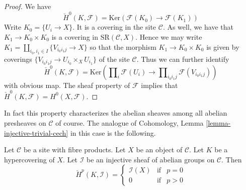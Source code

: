\begin{proof}
We have
$$
\check{H}^0(K, \mathcal{F})
=
\text{Ker}(\mathcal{F}(K_0) \longrightarrow \mathcal{F}(K_1))
$$
Write $K_0 = \{U_i \to X\}$. It is a covering in the site
$\mathcal{C}$. As well, we have that $K_1 \to K_0 \times K_0$
is a covering in $\text{SR}(\mathcal{C}, X)$. Hence we may
write $K_1 = \amalg_{i_0, i_1 \in I} \{V_{i_0i_1j} \to X\}$
so that the morphism $K_1 \to K_0 \times K_0$ is given
by coverings $\{V_{i_0i_1j} \to U_{i_0} \times_X U_{i_1}\}$
of the site $\mathcal{C}$. Thus we can further identify
$$
\check{H}^0(K, \mathcal{F})
=
\text{Ker}(
\prod\nolimits_{i} \mathcal{F}(U_i)
\longrightarrow
\prod\nolimits_{i_0i_1 j} \mathcal{F}(V_{i_0i_1j})
)
$$
with obvious map. The sheaf property of $\mathcal{F}$
implies that $\check{H}^0(K, \mathcal{F}) = H^0(X, \mathcal{F})$.
\end{proof}

\noindent
In fact this property characterizes the abelian sheaves among all
abelian presheaves on $\mathcal{C}$ of course.
The analogue of Cohomology, Lemma \ref{lemma-injective-trivial-cech}
in this case is the following.

\begin{lemma}
\label{lemma-injective-trivial-cech}
Let $\mathcal{C}$ be a site with fibre products.
Let $X$ be an object of $\mathcal{C}$.
Let $K$ be a hypercovering of $X$.
Let $\mathcal{I}$ be an injective sheaf of abelian groups on $\mathcal{C}$.
Then
$$
\check{H}^p(K, \mathcal{I}) =
\left\{
\begin{matrix}
\mathcal{I}(X) & \text{if} & p = 0 \\
0 & \text{if} & p > 0
\end{matrix}
\right.
$$
\end{lemma}

